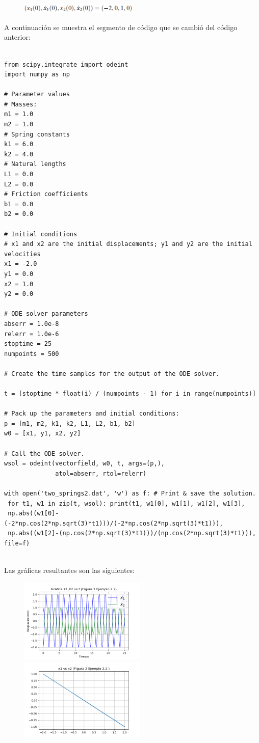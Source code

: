 \documentclass[a4paper]{article}
\begin{document}
\begin{figure}[ht!]
\centering
\includegraphics[width=0.5\textwidth]{Ejemplo2_2.PNG}
\end{figure}

A continuación se muestra el segmento de código que se cambió del código anterior:

\begin{verbatim}

from scipy.integrate import odeint
import numpy as np

# Parameter values
# Masses:
m1 = 1.0
m2 = 1.0
# Spring constants
k1 = 6.0
k2 = 4.0
# Natural lengths
L1 = 0.0
L2 = 0.0
# Friction coefficients
b1 = 0.0
b2 = 0.0

# Initial conditions
# x1 and x2 are the initial displacements; y1 and y2 are the initial velocities
x1 = -2.0
y1 = 0.0
x2 = 1.0
y2 = 0.0

# ODE solver parameters
abserr = 1.0e-8
relerr = 1.0e-6
stoptime = 25
numpoints = 500

# Create the time samples for the output of the ODE solver.

t = [stoptime * float(i) / (numpoints - 1) for i in range(numpoints)]

# Pack up the parameters and initial conditions:
p = [m1, m2, k1, k2, L1, L2, b1, b2]
w0 = [x1, y1, x2, y2]

# Call the ODE solver.
wsol = odeint(vectorfield, w0, t, args=(p,),
              atol=abserr, rtol=relerr)

with open('two_springs2.dat', 'w') as f: # Print & save the solution. 
 for t1, w1 in zip(t, wsol): print(t1, w1[0], w1[1], w1[2], w1[3],
 np.abs((w1[0]-(-2*np.cos(2*np.sqrt(3)*t1)))/(-2*np.cos(2*np.sqrt(3)*t1))), 
 np.abs((w1[2]-(np.cos(2*np.sqrt(3)*t1)))/(np.cos(2*np.sqrt(3)*t1))), file=f)
  
\end{verbatim}

Las gráficas resultantes son las siguientes:
\begin{figure}[ht!]
\centering 
\includegraphics[width=60mm]{Figura1Ex2_2.png}
\includegraphics[width=60mm]{Figura2Ex2_2.png}
\end{figure}
\end{document}

